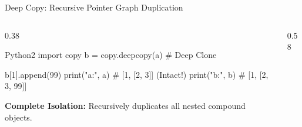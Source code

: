 \begin{frame}[fragile]{Deep Copy: Recursive Pointer Graph Duplication}
  \begin{columns}[T,onlytextwidth]
    \begin{column}{0.38\textwidth}
      \begin{HighlightedCodeBlock}{Python}{2}
import copy
b = copy.deepcopy(a)  # Deep Clone

b[1].append(99)
print("a:", a) # [1, [2, 3]] (Intact!)
print("b:", b) # [1, [2, 3, 99]]
      \end{HighlightedCodeBlock}
      \vspace{0.08cm}
      {\scriptsize\color{AWSEmerald}\textbf{Complete Isolation:} Recursively duplicates all nested compound objects.}
    \end{column}
    \begin{column}{0.58\textwidth}
      \centering
    \end{column}
  \end{columns}
  \vspace{0.15cm}
\end{frame}

